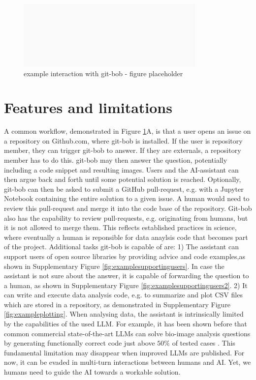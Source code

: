\documentclass{ecai}
\begin{document}
\begin{figure}[h]
\centering
\includegraphics[width=0.82\textwidth]{fig1_example_interaction.png}
\caption{example interaction with git-bob - figure placeholder
\newline
\newline
}
\label{fig:exampleinteraction}
\end{figure}


\section{Features and limitations}

A common workflow, demonstrated in Figure \ref{fig:exampleinteraction}A, is that a user opens an issue on a repository on Github.com, where git-bob is installed. If the user is repository member, they can trigger git-bob to answer. If they are externals, a repository member has to do this. git-bob may then answer the question, potentially including a code snippet and resulting images. Users and the AI-assistant can then argue back and forth until some potential solution is reached. Optionally, git-bob can then be asked to submit a GitHub pull-request, e.g. with a Jupyter Notebook containing the entire solution to a given issue. A human would need to review this pull-request and merge it into the code base of the repository. Git-bob also has the capability to review pull-requests, e.g. originating from humans, but it is not allowed to merge them. This reflects established practices in science, where eventually a human is reponsible for data anaylsis code that becomes part of the project. Additional tasks git-bob is capable of are: 1) The assistant can support users of open source libraries by providing advice and code examples,as shown in Supplementary Figure \ref{fig:examplesupportingusers}. In case the assistant is not sure about the answer, it is capable of forwarding the question to a human, as shown in Supplementary Figure \ref{fig:examplesupportingusers2}. 2) It can write and execute data analysis code, e.g. to summarize and plot CSV files which are stored in a repository, as demonstrated in Supplementary Figure \ref{fig:exampleplotting}. When analysing data, the assistant is intrinsically limited by the capabilities of the used LLM. For example, it has been shown before that common commercial state-of-the-art LLMs can solve bio-image analysis questions by generating functionally correct code just above $50\%$ of tested cases \citep{benchmark_llm_bia}. This fundamental limitation may disappear when improved LLMs are published. For now, it can be evaded in multi-turn interactions between humans and AI. Yet, we humans need to guide the AI towards a workable solution. 
\end{document}

